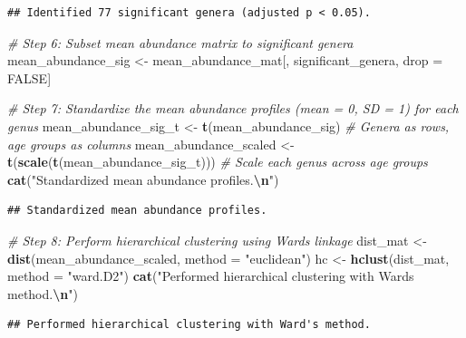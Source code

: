 \documentclass[
]{article}
\newenvironment{Shaded}{\begin{snugshade}}{\end{snugshade}}
\newcommand{\AttributeTok}[1]{\textcolor[rgb]{0.13,0.29,0.53}{#1}}
\newcommand{\CommentTok}[1]{\textcolor[rgb]{0.56,0.35,0.01}{\textit{#1}}}
\newcommand{\ConstantTok}[1]{\textcolor[rgb]{0.56,0.35,0.01}{#1}}
\newcommand{\FunctionTok}[1]{\textcolor[rgb]{0.13,0.29,0.53}{\textbf{#1}}}
\newcommand{\NormalTok}[1]{#1}
\newcommand{\OtherTok}[1]{\textcolor[rgb]{0.56,0.35,0.01}{#1}}
\newcommand{\SpecialCharTok}[1]{\textcolor[rgb]{0.81,0.36,0.00}{\textbf{#1}}}
\newcommand{\StringTok}[1]{\textcolor[rgb]{0.31,0.60,0.02}{#1}}
\begin{document}
\begin{verbatim}
## Identified 77 significant genera (adjusted p < 0.05).
\end{verbatim}

\begin{Shaded}
\begin{Highlighting}[]
\CommentTok{\# Step 6: Subset mean abundance matrix to significant genera}
\NormalTok{mean\_abundance\_sig }\OtherTok{\textless{}{-}}\NormalTok{ mean\_abundance\_mat[, significant\_genera, drop }\OtherTok{=} \ConstantTok{FALSE}\NormalTok{]}

\CommentTok{\# Step 7: Standardize the mean abundance profiles (mean = 0, SD = 1) for each genus}
\NormalTok{mean\_abundance\_sig\_t }\OtherTok{\textless{}{-}} \FunctionTok{t}\NormalTok{(mean\_abundance\_sig)  }\CommentTok{\# Genera as rows, age groups as columns}
\NormalTok{mean\_abundance\_scaled }\OtherTok{\textless{}{-}} \FunctionTok{t}\NormalTok{(}\FunctionTok{scale}\NormalTok{(}\FunctionTok{t}\NormalTok{(mean\_abundance\_sig\_t)))  }\CommentTok{\# Scale each genus across age groups}
\FunctionTok{cat}\NormalTok{(}\StringTok{"Standardized mean abundance profiles.}\SpecialCharTok{\textbackslash{}n}\StringTok{"}\NormalTok{)}
\end{Highlighting}
\end{Shaded}

\begin{verbatim}
## Standardized mean abundance profiles.
\end{verbatim}

\begin{Shaded}
\begin{Highlighting}[]
\CommentTok{\# Step 8: Perform hierarchical clustering using Ward\textquotesingle{}s linkage}
\NormalTok{dist\_mat }\OtherTok{\textless{}{-}} \FunctionTok{dist}\NormalTok{(mean\_abundance\_scaled, }\AttributeTok{method =} \StringTok{"euclidean"}\NormalTok{)}
\NormalTok{hc }\OtherTok{\textless{}{-}} \FunctionTok{hclust}\NormalTok{(dist\_mat, }\AttributeTok{method =} \StringTok{"ward.D2"}\NormalTok{)}
\FunctionTok{cat}\NormalTok{(}\StringTok{"Performed hierarchical clustering with Ward\textquotesingle{}s method.}\SpecialCharTok{\textbackslash{}n}\StringTok{"}\NormalTok{)}
\end{Highlighting}
\end{Shaded}

\begin{verbatim}
## Performed hierarchical clustering with Ward's method.
\end{verbatim}
\end{document}
